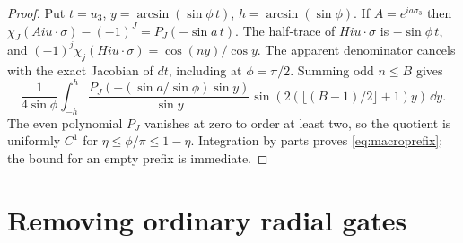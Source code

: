 \begin{proof}
Put \(t=u_3\), \(y=\arcsin(\sin\phi\,t)\), \(h=\arcsin(\sin\phi)\). If \(A=e^{ia\sigma_3}\) then
\(\chi_J(Aiu\cdot\sigma)-(-1)^J=P_J(-\sin a\,t)\).
The half-trace of \(Hiu\cdot\sigma\) is \(-\sin\phi\,t\), and
\((-1)^j\chi_j(Hiu\cdot\sigma)=\cos(ny)/\cos y\).
The apparent denominator cancels with the exact Jacobian of \(dt\), including at \(\phi=\pi/2\). Summing odd \(n\le B\) gives
\[
 \frac{1}{4\sin\phi}\int_{-h}^h
 \frac{P_J(-(\sin a/\sin\phi)\sin y)}{\sin y}
                 \sin(2(\lfloor(B-1)/2\rfloor+1)y)\,\dd y.
\]
The even polynomial \(P_J\) vanishes at zero to order at least two, so the quotient is uniformly \(C^1\) for \(\eta\le\phi/\pi\le1-\eta\). Integration by parts proves \eqref{eq:macroprefix}; the bound for an empty prefix is immediate.
\end{proof}

\section{Removing ordinary radial gates}\label{sec:radial}


